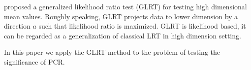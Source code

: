 \documentclass[review]{elsarticle}
\theoremstyle{plain}
\theoremstyle{definition}
\theoremstyle{remark}
\begin{document}



\cite{Zhao2016A} proposed a generalized likelihood ratio test (GLRT) for testing high dimensional mean values.
Roughly speaking, GLRT projects data to lower dimension by a direction $a$ such that likelihood ratio is maximized. GLRT is likelihood based, it can be regarded as a generalization of classical LRT in high dimension setting.

In this paper we apply the GLRT method to the problem of testing the significance of PCR.\
\end{document}
